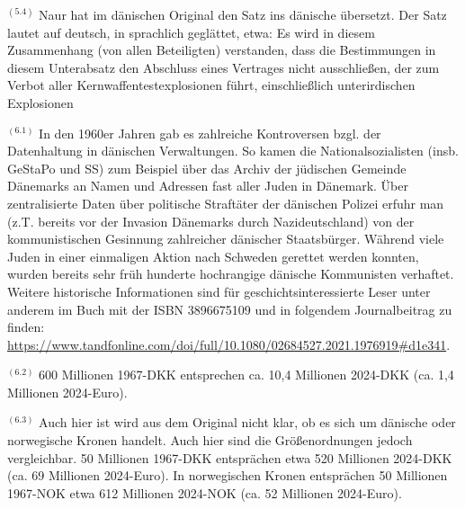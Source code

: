 $^{(5.4)}$
Naur hat im dänischen Original den Satz ins dänische übersetzt. Der Satz lautet auf deutsch, in sprachlich geglättet, etwa: Es wird in diesem Zusammenhang (von allen Beteiligten) verstanden, dass die Bestimmungen in diesem Unterabsatz den Abschluss eines Vertrages nicht ausschließen, der zum Verbot aller Kernwaffentestexplosionen führt, einschließlich unterirdischen Explosionen

$^{(6.1)}$
In den 1960er Jahren gab es zahlreiche Kontroversen bzgl. der Datenhaltung in dänischen Verwaltungen. So kamen die Nationalsozialisten (insb. GeStaPo und SS) zum Beispiel über das Archiv der jüdischen Gemeinde Dänemarks an Namen und Adressen fast aller Juden in Dänemark. Über zentralisierte Daten über politische Straftäter der dänischen Polizei erfuhr man (z.T. bereits vor der Invasion Dänemarks durch Nazideutschland) von der kommunistischen Gesinnung zahlreicher dänischer Staatsbürger. Während viele Juden in einer einmaligen Aktion nach Schweden gerettet werden konnten, wurden bereits sehr früh hunderte hochrangige dänische Kommunisten verhaftet. Weitere historische Informationen sind für geschichtsinteressierte Leser unter anderem im Buch mit der ISBN 3896675109 und in folgendem Journalbeitrag zu finden: \url{https://www.tandfonline.com/doi/full/10.1080/02684527.2021.1976919#d1e341}.

$^{(6.2)}$
600 Millionen 1967-DKK entsprechen ca. 10,4 Millionen 2024-DKK (ca. 1,4 Millionen 2024-Euro).

$^{(6.3)}$
Auch hier ist wird aus dem Original nicht klar, ob es sich um dänische oder norwegische Kronen handelt. Auch hier sind die Größenordnungen jedoch vergleichbar. 50 Millionen 1967-DKK entsprächen etwa 520 Millionen 2024-DKK (ca. 69 Millionen 2024-Euro). In norwegischen Kronen entsprächen 50 Millionen 1967-NOK etwa 612 Millionen 2024-NOK (ca. 52 Millionen 2024-Euro). 